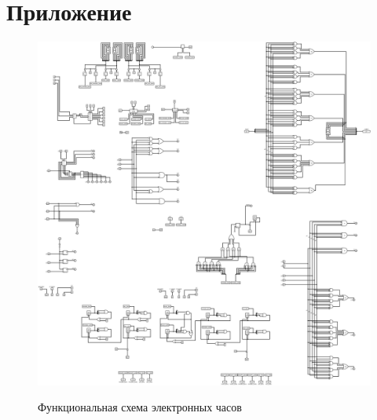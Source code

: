 \documentclass[a3paper,12pt]{article}
\begin{document}
\section*{Приложение}
\begin{figure}[htpb]
	\centering
	\setcounter{figure}{29}
	\includegraphics[scale=0.25]{logisim/img/functional scheme.png}
	\label{functional scheme} 
	\caption {Функциональная схема электронных часов }
\end{figure}
	
\end{document}
